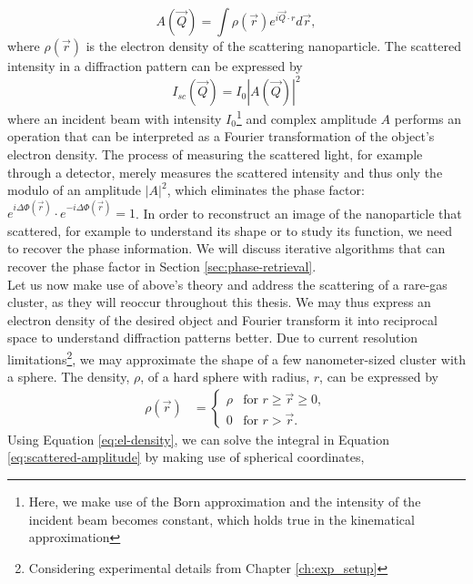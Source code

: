 \begin{equation}
A(\vec{Q})=\int \rho\left(\vec{r}\right) e^{i \vec{Q}\cdot r}d\vec{r},
\label{eq:scattered-amplitude}
\end{equation}
where $\rho\left(\vec{r}\right)$ is the electron density of the scattering nanoparticle. The scattered intensity in a diffraction pattern can be expressed by
\begin{equation}
I_{sc}\left(\vec{Q}\right)=I_{0}\left|A(\vec{Q})\right|^{2}
\label{eq:scattered-intensity}
\end{equation}
where an incident beam with intensity $I_{0}$\footnote{Here, we make use of the Born approximation and the intensity of the incident beam becomes constant, which holds true in the kinematical approximation} and complex amplitude $A$ performs an operation that can be interpreted as a Fourier transformation of the object's electron density. The process of measuring the scattered light, for example through a detector, merely measures the scattered intensity and thus only the modulo of an amplitude $\left|A\right|^{2}$, which eliminates the phase factor: $e^{i\Delta\Phi\left(\vec{r}\right)}\cdot e^{-i\Delta\Phi\left(\vec{r}\right)}=1$. In order to reconstruct an image of the nanoparticle that scattered, for example to understand its shape or to study its function, we need to recover the phase information. We will discuss iterative algorithms that can recover the phase factor in Section \ref{sec:phase-retrieval}.\\[1\baselineskip]
%
Let us now make use of above's theory and address the scattering of a rare-gas cluster, as they will reoccur throughout this thesis. We may thus express an electron density of the desired object and Fourier transform it into reciprocal space to understand diffraction patterns better. Due to current resolution limitations\footnote{Considering experimental details from Chapter \ref{ch:exp_setup}}, we may approximate the shape of a few nanometer-sized cluster with a sphere. The density, $\rho$, of a hard sphere with radius, $r$, can be expressed by 
\begin{align}
\rho\left(\vec{r}\right)&=\begin{cases}
\rho& \text{for $r \geq \vec{r} \geq 0$},\\
0&\text{for $r > \vec{r}$}.
\end{cases}
\label{eq:el-density}
\end{align}
Using Equation \eqref{eq:el-density}, we can solve the integral in Equation \eqref{eq:scattered-amplitude} by making use of spherical coordinates,
